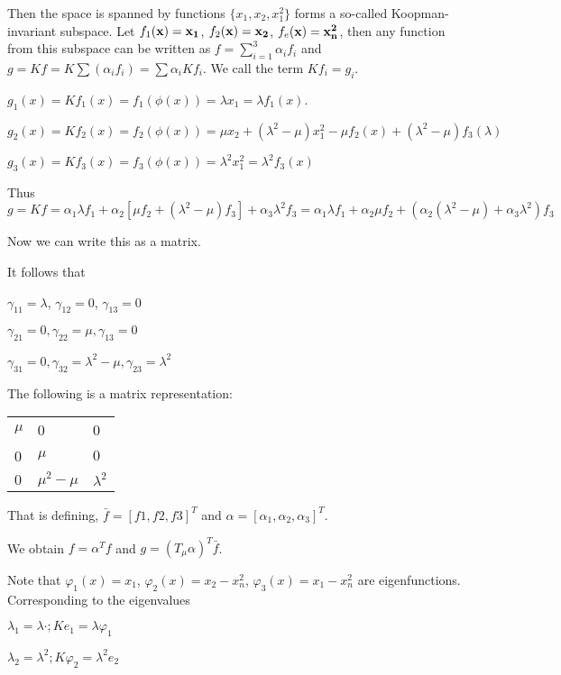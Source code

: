 \documentclass[11pt]{article}
\begin{document}
Then the space is spanned by functions \(\{x_1, x_2, x_1^2\}\) forms a so-called
Koopman-invariant subspace. Let \(f_1(\bf{x}) = x_1\), \(f_2(\bf{x}) = x_2\),
\(f_e(\bf{x}) = x_n^2\), then any function from this subspace can be written as
\(f = \sum_{i=1}^{3} \alpha_i f_i\) and \(g=Kf = K\sum(\alpha_i f_i) = \sum
   \alpha_i Kf_i\). We call the term \(Kf_i = g_i\).

\(g_1(x) = Kf_1(x) = f_1(\phi(x)) = \lambda x_1 =\lambda f_1(x)\).

\(g_2(x) = Kf_2(x) = f_2(\phi(x)) =\mu x_2 + (\lambda^2 - \mu)x_1^2 - \mu
   f_2(x) + (\lambda^2 - \mu)f_3(\lambda)\)

\(g_3(x) = Kf_3(x) = f_3(\phi(x)) = \lambda^2 x_1^2 = \lambda^2 f_3(x)\)

Thus \(g = Kf = \alpha_1 \lambda f_1 + \alpha_2[\mu f_2 + (\lambda^2 -
   \mu)f_3] + \alpha_3 \lambda^2 f_3 = \alpha_1\lambda f_1 + \alpha_2 \mu f_2 +
   (\alpha_2(\lambda^2 - \mu) + \alpha_3 \lambda^2)f_3\)

Now we can write this as a matrix.

It follows that

\(\gamma_{11} = \lambda\), \(\gamma_{12} = 0\), \(\gamma_{13} = 0\)

\(\gamma_{21} = 0, \gamma_{22} = \mu, \gamma_{13} = 0\)

\(\gamma_{31} = 0, \gamma_{32} = \lambda^2 - \mu, \gamma_{23} = \lambda^2\)

The following is a matrix representation: 

\begin{center}
\begin{tabular}{lll}
\(\mu\) & 0 & 0\\
0 & \(\mu\) & \(0\)\\
\(0\) & \(\mu^2 - \mu\) & \(\lambda^2\)\\
\end{tabular}
\end{center}

That is defining, \(\bar{f} = [f1, f2, f3]^T\) and \(\alpha = [\alpha_1,
   \alpha_2, \alpha_3]^T\).

We obtain \(f = \alpha^T f\) and \(g=(T_\mu \alpha)^T\bar{f}\).

Note that \(\varphi_1(x) = x_1\), \(\varphi_2(x)=x_2 - x_n^2\), \(\varphi_3(x) = x_1-x_n^2\) are
eigenfunctions. Corresponding to the eigenvalues

\(\lambda_1 = \lambda \cdot; Ke_1 = \lambda \varphi_1\)

\(\lambda_2 = \lambda^2; K\varphi_2 = \lambda^2e_2\)
\end{document}

